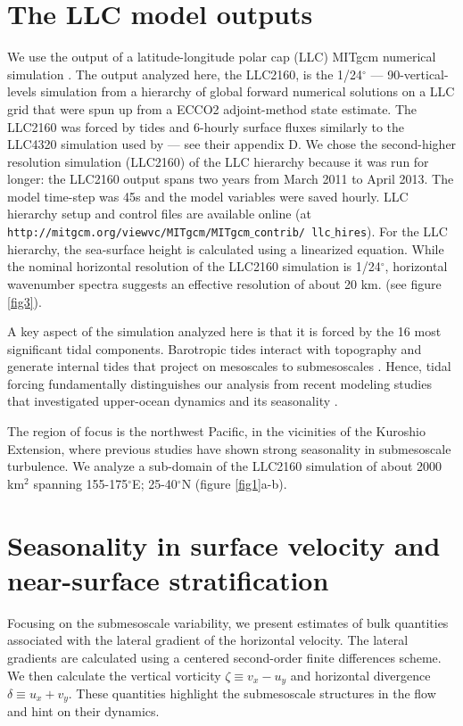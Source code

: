 \documentclass[grl]{agutex2015}
\begin{document}
\begin{article}
\section{The LLC model outputs}
We use the output of a latitude-longitude polar cap (LLC)
MITgcm  numerical simulation  \citep{forget_etal2015}. The output analyzed here, the LLC2160,
is the 1/24$^\circ$ --- 90-vertical-levels simulation from a hierarchy of global
forward numerical solutions on a LLC grid that were
spun up from a ECCO2 adjoint-method state estimate. The LLC2160 was forced by
tides and 6-hourly surface fluxes similarly to the LLC4320 simulation
used by \citet{rocha_etal2016} --- see their appendix D. We chose the second-higher
resolution  simulation (LLC2160) of the LLC hierarchy because it was run for longer:
the LLC2160 output spans two years from March 2011 to April 2013. The model time-step
was 45s and the model variables were saved hourly. LLC hierarchy setup
and control files are available online
(at \texttt{http://mitgcm.org/viewvc/MITgcm/MITgcm$\_$contrib/
llc$\_$hires}). For the LLC hierarchy, the sea-surface height is calculated
using a linearized equation. While the nominal horizontal resolution  of the
LLC2160 simulation is 1/24$^\circ$,
 horizontal wavenumber spectra suggests an effective resolution of about 20 km.
 (see figure \ref{fig3}).

A key aspect of the simulation analyzed here is that it is forced by
the 16 most significant tidal components.
Barotropic tides interact with topography and generate internal
tides that project on mesoscales to submesoscales
\citep{rocha_etal2016}. Hence, tidal forcing fundamentally distinguishes our analysis
from recent modeling studies that investigated upper-ocean dynamics
and its seasonality \citep{sasaki_etal2014,qiu_etal2014}.

The region of focus is the northwest Pacific, in the vicinities of the Kuroshio
Extension, where previous studies have
shown strong seasonality in submesoscale turbulence.
We analyze a sub-domain of the LLC2160 simulation of about 2000 km$^2$
spanning 155-175$^\circ$E; 25-40$^\circ$N (figure \ref{fig1}a-b).

\section{Seasonality in surface velocity and near-surface stratification}

Focusing on the submesoscale variability, we present estimates of bulk quantities
associated with the lateral gradient of the horizontal velocity.
The lateral gradients are calculated using a centered
second-order finite differences scheme. We then calculate
the vertical vorticity $\zeta \equiv v_x - u_y$ and
horizontal divergence $\delta \equiv u_x + v_y$.
These quantities highlight the submesoscale structures in the flow
and hint on their dynamics.


\end{article}
\end{document}
